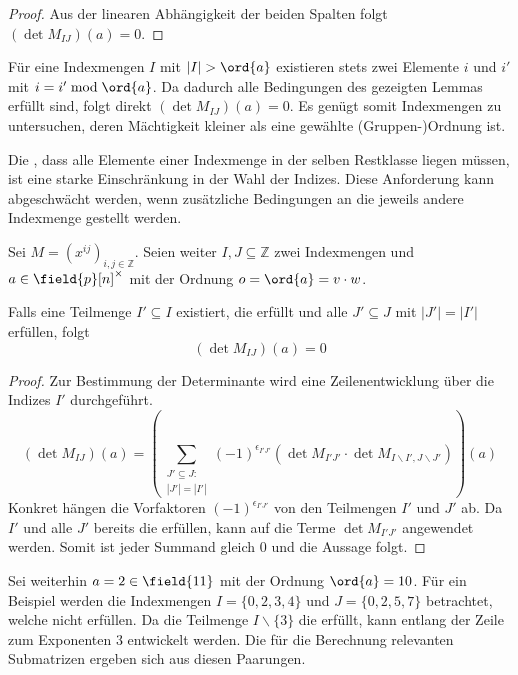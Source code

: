 {\begin{proof}
    Aus der linearen Abhängigkeit der beiden Spalten folgt $(\det M_{IJ})(a) = 0$.
\end{proof}

Für eine Indexmengen $I$ mit $|I| > \ord{a}$ existieren stets zwei Elemente $i$ und $i'$ mit $i = i' \bmod \ord{a}$. Da dadurch alle Bedingungen des gezeigten Lemmas erfüllt sind, folgt direkt $(\det M_{IJ})(a) = 0$. Es genügt somit Indexmengen zu untersuchen, deren Mächtigkeit kleiner als eine gewählte (Gruppen-)Ordnung ist.

Die , dass alle Elemente einer Indexmenge in der selben Restklasse liegen müssen, ist eine starke Einschränkung in der Wahl der Indizes. Diese Anforderung kann abgeschwächt werden, wenn zusätzliche Bedingungen an die jeweils andere Indexmenge gestellt werden.

\begin{satz} \label{satz:equal-columns-subs}
    Sei $M = \left( x^{ij} \right)_{i,j \in \mathbb{Z}}$. Seien weiter $I,J \subseteq \mathbb{Z}$ zwei Indexmengen und $a \in \field{p}[n]^\times$ mit der Ordnung $o = \ord{a} = v\cdot w$.

    Falls eine Teilmenge $I' \subseteq I$ existiert, die  erfüllt und alle $J' \subseteq J$ mit $|J'| = |I'|$  erfüllen, folgt
    \begin{equation*}
        (\det M_{IJ})(a) = 0
    \end{equation*}
\end{satz}

\begin{proof}
    Zur Bestimmung der Determinante wird eine Zeilenentwicklung über die Indizes $I'$ durchgeführt. 
\begin{equation*}
    (\det M_{IJ})(a) = \left( \sum_{\substack{J'\subseteq J:\\|J'| = |I'|}} (-1)^{\epsilon_{I'J'}} \left( \det M_{I'J'} \cdot \det M_{I\backslash I',J\backslash J'} \right) \right)(a) %
\end{equation*}
Konkret hängen die Vorfaktoren $(-1)^{\epsilon_{I'J'}}$ von den Teilmengen $I'$ und $J'$ ab. Da $I'$ und alle $J'$ bereits die  erfüllen, kann  auf die Terme $\det M_{I'J'}$ angewendet werden. Somit ist jeder Summand gleich $0$ und die Aussage folgt.
\end{proof}

Sei weiterhin $a = 2 \in \field{11}$ mit der Ordnung $\ord{a} = 10$. Für ein Beispiel werden die Indexmengen $I = \{0,2,3,4\}$ und $J = \{0,2,5,7\}$ betrachtet, welche  nicht erfüllen. Da die Teilmenge $I\backslash\{3\}$ die  erfüllt, kann entlang der Zeile zum Exponenten $3$ entwickelt werden. Die für die Berechnung relevanten Submatrizen ergeben sich aus diesen Paarungen.

}
